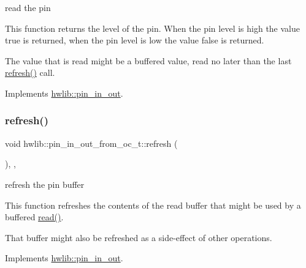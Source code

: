 read the pin

This function returns the level of the pin. When the pin level is high the value true is returned, when the pin level is low the value false is returned.

The value that is read might be a buffered value, read no later than the last \hyperlink{classhwlib_1_1pin__in__out__from__oc__t_a2662b0d953b8af04f5bb7994cd2787e5}{refresh()} call. 

Implements \hyperlink{classhwlib_1_1pin__in__out_a5caebc7ab9fe49b7e020b89f0a2cf892}{hwlib\+::pin\+\_\+in\+\_\+out}.

\mbox{\label{classhwlib_1_1pin__in__out__from__oc__t_a2662b0d953b8af04f5bb7994cd2787e5}} 
\subsubsection{\texorpdfstring{refresh()}{refresh()}}
{\footnotesize\ttfamily void hwlib\+::pin\+\_\+in\+\_\+out\+\_\+from\+\_\+oc\+\_\+t\+::refresh (\begin{DoxyParamCaption}{ }\end{DoxyParamCaption})\hspace{0.3cm}{\ttfamily [inline]}, {\ttfamily [override]}, {\ttfamily [virtual]}}

refresh the pin buffer

This function refreshes the contents of the read buffer that might be used by a buffered \hyperlink{classhwlib_1_1pin__in__out__from__oc__t_ae9345a726556cf5ac138f575df044722}{read()}.

That buffer might also be refreshed as a side-\/effect of other operations. 

Implements \hyperlink{classhwlib_1_1pin__in__out_a8815baac4e5193ec68795956f5e363a6}{hwlib\+::pin\+\_\+in\+\_\+out}.

\mbox{\label{classhwlib_1_1pin__in__out__from__oc__t_aeba3375851126ed813762bc16fee057c}} 
